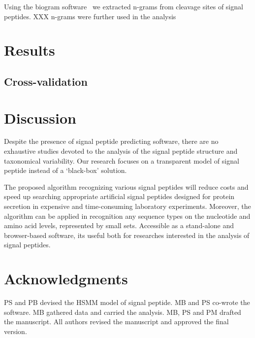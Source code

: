 \documentclass[fleqn,10pt,twoside]{gcb15submission}
\begin{document}
Using the biogram software~\citep{biogramPackage} we extracted n-grams from cleavage sites of signal peptides. 
XXX n-grams were further used in the analysis

\section*{Results}

\subsection*{Cross-validation}



\section*{Discussion}

Despite the presence of signal peptide predicting software, there are no exhaustive studies devoted to the analysis of the signal peptide structure and taxonomical variability. Our research focuses on a transparent model of signal peptide instead of a ‘black-box’ solution.

The proposed algorithm recognizing various signal peptides will reduce costs and speed up searching appropriate artificial signal peptides designed for protein secretion in expensive and time-consuming laboratory experiments. Moreover, the algorithm can be applied in recognition any sequence types on the nucleotide and amino acid levels, represented by small sets. Accessible as a stand-alone and browser-based software, its useful both for researches interested in the analysis of signal peptides.


\section*{Acknowledgments}
PS and PB devised the HSMM model of signal peptide. MB and PS co-wrote the software. MB gathered data and carried the analysis.
MB, PS and PM drafted the manuscript. All authors revised the manuscript and approved the final version.



\end{document}

